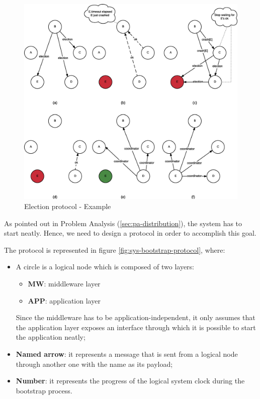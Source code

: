 \begin{figure}[H]
  \centering
  \includegraphics[width=\columnwidth]{images/solution/election.eps}
  \caption{Election protocol - Example}
  \label{fig:election-protocol-ex}
\end{figure}

As pointed out in Problem Analysis (\ref{sec:pa-distribution}), the system has
to start neatly. Hence, we need to design a protocol in order to accomplish
this goal.

The protocol is represented in figure \ref{fig:sys-bootstrap-protocol}, where:

\begin{itemize}
  \item A circle is a logical node which is composed of two layers:
    \begin{itemize}
      \item \textbf{MW}:  middleware layer
      \item \textbf{APP}: application layer
  \end{itemize}
    Since the middleware has to be application-independent, it only assumes
    that the application layer exposes an interface through which it is
    possible to start the application neatly;
  \item \textbf{Named arrow}: it represents a message that is sent from a
logical node through another one with the name as its payload;
  \item \textbf{Number}: it represents the progress of the logical system clock
during the bootstrap process.
\end{itemize}

